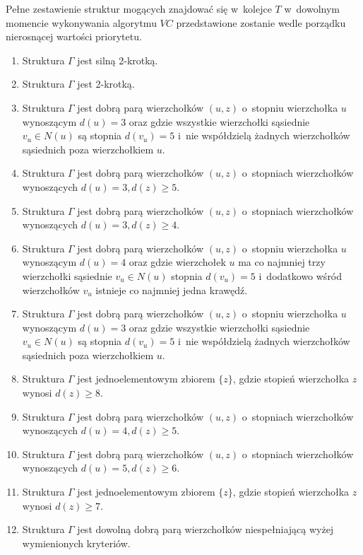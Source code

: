 {  Pełne zestawienie struktur mogących znajdować się w~kolejce $T$ w~dowolnym momencie wykonywania algorytmu $VC$ przedstawione zostanie wedle porządku nierosnącej wartości priorytetu.
  \begin{enumerate}[(1)]
    \item Struktura $\Gamma$ jest silną 2-krotką.
    \item Struktura $\Gamma$ jest 2-krotką.
    \item Struktura $\Gamma$ jest dobrą parą wierzchołków $(u, z)$ o~stopniu wierzchołka $u$ wynoszącym $d(u)=3$ oraz gdzie wszystkie wierzchołki sąsiednie $v_u \in N(u)$ są stopnia $d(v_u)=5$ i~nie współdzielą żadnych wierzchołków sąsiednich poza wierzchołkiem $u$.
    \item Struktura $\Gamma$ jest dobrą parą wierzchołków $(u, z)$ o~stopniach wierzchołków wynoszących $d(u)=3, d(z) \geq 5$.
    \item Struktura $\Gamma$ jest dobrą parą wierzchołków $(u, z)$ o~stopniach wierzchołków wynoszących $d(u)=3, d(z) \geq 4$.
    \item Struktura $\Gamma$ jest dobrą parą wierzchołków $(u, z)$ o~stopniu wierzchołka $u$ wynoszącym $d(u)=4$ oraz gdzie wierzchołek $u$ ma co najmniej trzy wierzchołki sąsiednie $v_u \in N(u)$ stopnia $d(v_u)=5$ i~dodatkowo wśród wierzchołków $v_u$ istnieje co najmniej jedna krawędź.
    \item Struktura $\Gamma$ jest dobrą parą wierzchołków $(u, z)$ o~stopniu wierzchołka $u$ wynoszącym $d(u)=3$ oraz gdzie wszystkie wierzchołki sąsiednie $v_u \in N(u)$ są stopnia $d(v_u)=5$ i~nie współdzielą żadnych wierzchołków sąsiednich poza wierzchołkiem $u$.
    \item Struktura $\Gamma$ jest jednoelementowym zbiorem $\{z\}$, gdzie stopień wierzchołka $z$ wynosi $d(z) \geq 8$.
    \item Struktura $\Gamma$ jest dobrą parą wierzchołków $(u, z)$ o~stopniach wierzchołków wynoszących $d(u)=4, d(z) \geq 5$.
    \item Struktura $\Gamma$ jest dobrą parą wierzchołków $(u, z)$ o~stopniach wierzchołków wynoszących $d(u)=5, d(z) \geq 6$.
    \item Struktura $\Gamma$ jest jednoelementowym zbiorem $\{z\}$, gdzie stopień wierzchołka $z$ wynosi $d(z) \geq 7$.
    \item Struktura $\Gamma$ jest dowolną dobrą parą wierzchołków niespełniającą wyżej wymienionych kryteriów.
  \end{enumerate}

}
